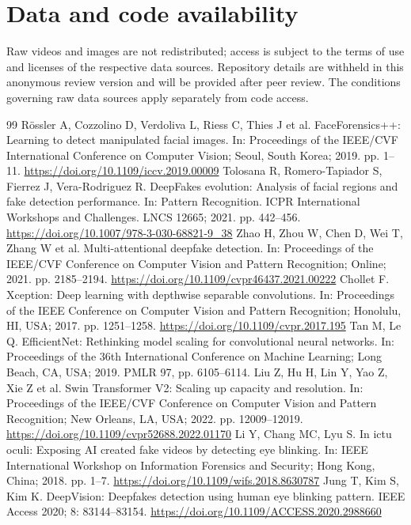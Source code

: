 \documentclass[a4paper]{elektr}
\begin{document}
\section*{Data and code availability}
Raw videos and images are not redistributed; access is subject to the terms of use and licenses of the respective data sources. Repository details are withheld in this anonymous review version and will be provided after peer review. The conditions governing raw data sources apply separately from code access.
\FloatBarrier
\begin{thebibliography}{99}
 Rössler A, Cozzolino D, Verdoliva L, Riess C, Thies J et al. FaceForensics++: Learning to detect manipulated facial images. In: Proceedings of the IEEE/CVF International Conference on Computer Vision; Seoul, South Korea; 2019. pp. 1--11. \url{https://doi.org/10.1109/iccv.2019.00009}
 Tolosana R, Romero-Tapiador S, Fierrez J, Vera-Rodriguez R. DeepFakes evolution: Analysis of facial regions and fake detection performance. In: Pattern Recognition. ICPR International Workshops and Challenges. LNCS 12665; 2021. pp. 442--456. \url{https://doi.org/10.1007/978-3-030-68821-9_38}
 Zhao H, Zhou W, Chen D, Wei T, Zhang W et al. Multi-attentional deepfake detection. In: Proceedings of the IEEE/CVF Conference on Computer Vision and Pattern Recognition; Online; 2021. pp. 2185--2194. \url{https://doi.org/10.1109/cvpr46437.2021.00222}
 Chollet F. Xception: Deep learning with depthwise separable convolutions. In: Proceedings of the IEEE Conference on Computer Vision and Pattern Recognition; Honolulu, HI, USA; 2017. pp. 1251--1258. \url{https://doi.org/10.1109/cvpr.2017.195}
 Tan M, Le Q. EfficientNet: Rethinking model scaling for convolutional neural networks. In: Proceedings of the 36th International Conference on Machine Learning; Long Beach, CA, USA; 2019. PMLR 97, pp. 6105--6114.
 Liu Z, Hu H, Lin Y, Yao Z, Xie Z et al. Swin Transformer V2: Scaling up capacity and resolution. In: Proceedings of the IEEE/CVF Conference on Computer Vision and Pattern Recognition; New Orleans, LA, USA; 2022. pp. 12009--12019. \url{https://doi.org/10.1109/cvpr52688.2022.01170}
 Li Y, Chang MC, Lyu S. In ictu oculi: Exposing AI created fake videos by detecting eye blinking. In: IEEE International Workshop on Information Forensics and Security; Hong Kong, China; 2018. pp. 1--7. \url{https://doi.org/10.1109/wifs.2018.8630787}
 Jung T, Kim S, Kim K. DeepVision: Deepfakes detection using human eye blinking pattern. IEEE Access 2020; 8: 83144--83154. \url{https://doi.org/10.1109/ACCESS.2020.2988660}

\end{thebibliography}
\end{document}
